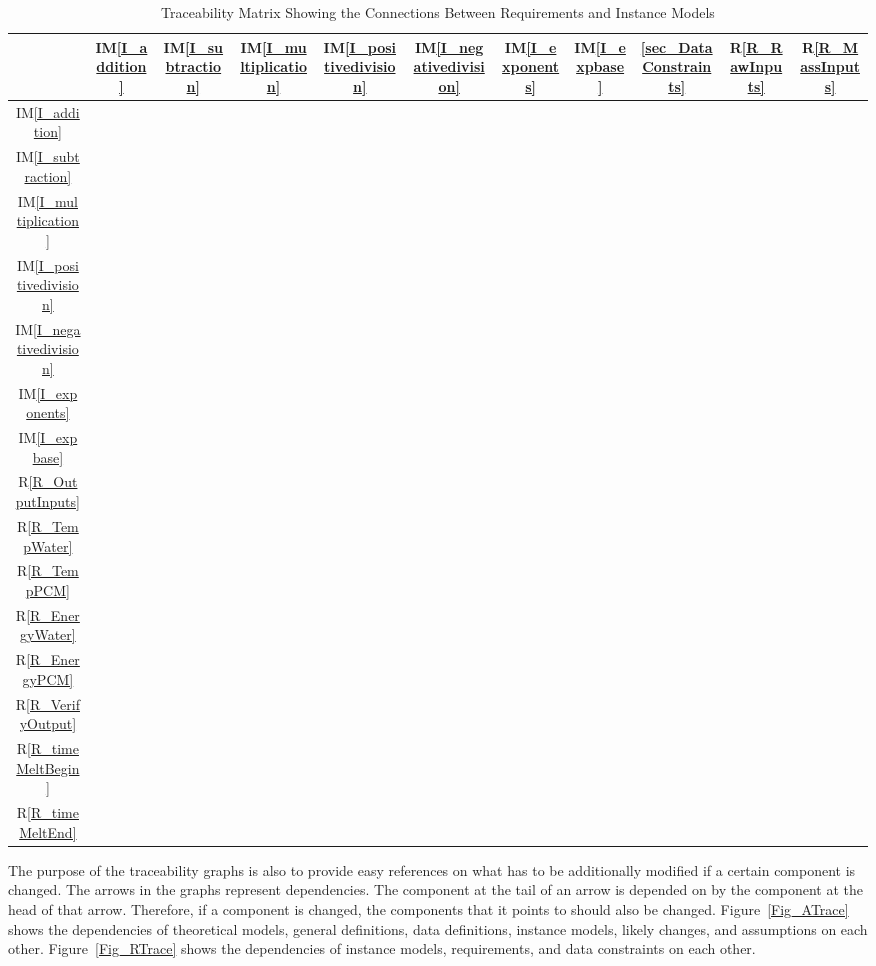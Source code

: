 \documentclass[12pt]{article}
\newcommand{\iref}[1]{IM\ref{#1}}
\newcommand{\rref}[1]{R\ref{#1}}
\begin{document}
\begin{table}[h!]
\centering
\begin{tabular}{|c|c|c|c|c|c|c|c|c|c|c|}
\hline
	& \iref{I_addition}& \iref{I_subtraction}& \iref{I_multiplication}& 
	\iref{I_positivedivision}& \iref{I_negativedivision}& \iref{I_exponents}& 
	\iref{I_expbase}& \ref{sec_DataConstraints}& \rref{R_RawInputs}& 
	\rref{R_MassInputs} \\
\hline
\iref{I_addition}            & & & & & & & &&& \\ \hline
\iref{I_subtraction}            & & & & & & &  &&&\\ \hline
\iref{I_multiplication}          & & & & & & &  &&&\\ \hline
\iref{I_positivedivision}          & & & & & & & &&& \\ \hline
\iref{I_negativedivision}     & & & & & & & &&&\\ \hline
\iref{I_exponents}    & & & & & & & &&&\\ \hline
\iref{I_expbase}   & & & & & & & &&&\\ \hline
\rref{R_OutputInputs}  & & & & & & &  &&&\\ \hline
\rref{R_TempWater}     & & & & & & & &&&\\ \hline 
\rref{R_TempPCM}       & & & & & & & &&&\\ \hline
\rref{R_EnergyWater}   & & & & & & & &&&\\ \hline
\rref{R_EnergyPCM}     & & & & & & & &&&\\ \hline
\rref{R_VerifyOutput}  & & & & & & & &&&\\ \hline
\rref{R_timeMeltBegin} & & & & & & & &&&\\ \hline
\rref{R_timeMeltEnd}   & & & & & & & &&&\\ 
\hline
\end{tabular}
\caption{Traceability Matrix Showing the Connections Between Requirements and Instance Models}
\label{Table:R_trace}
\end{table}

The purpose of the traceability graphs is also to provide easy references on
what has to be additionally modified if a certain component is changed.  The
arrows in the graphs represent dependencies. The component at the tail of an
arrow is depended on by the component at the head of that arrow. Therefore, if a
component is changed, the components that it points to should also be
changed. Figure~\ref{Fig_ATrace} shows the dependencies of theoretical models,
general definitions, data definitions, instance models, likely changes, and
assumptions on each other. Figure~\ref{Fig_RTrace} shows the dependencies of
instance models, requirements, and data constraints on each other.
\end{document}
